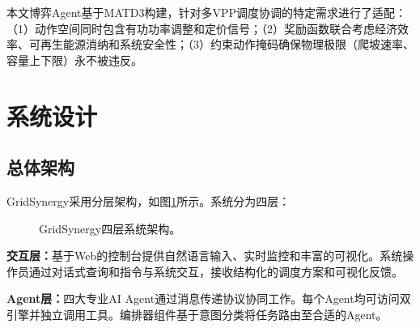 \documentclass[conference]{IEEEtran}
\begin{document}
本文博弈Agent基于MATD3构建，针对多VPP调度协调的特定需求进行了适配：（1）动作空间同时包含有功功率调整和定价信号；（2）奖励函数联合考虑经济效率、可再生能源消纳和系统安全性；（3）约束动作掩码确保物理极限（爬坡速率、容量上下限）永不被违反。

\section{系统设计}

\subsection{总体架构}

GridSynergy采用分层架构，如图\ref{fig:architecture}所示。系统分为四层：

\begin{figure}[t]
\centering
{}
\caption{GridSynergy四层系统架构。}
\label{fig:architecture}
\end{figure}

\textbf{交互层：}基于Web的控制台提供自然语言输入、实时监控和丰富的可视化。系统操作员通过对话式查询和指令与系统交互，接收结构化的调度方案和可视化反馈。

\textbf{Agent层：}四大专业AI Agent通过消息传递协议协同工作。每个Agent均可访问双引擎并独立调用工具。编排器组件基于意图分类将任务路由至合适的Agent。
\end{document}
